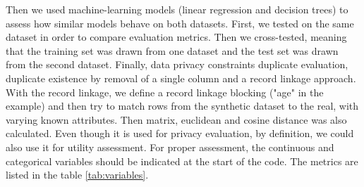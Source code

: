 Then we used machine-learning models (linear regression and decision trees) to assess how similar models behave on both datasets. First, we tested on the same dataset in order to compare evaluation metrics. Then we cross-tested, meaning that the training set was drawn from one dataset and the test set was drawn from the second dataset. Finally, data privacy constraints duplicate evaluation, duplicate existence by removal of a single column and a record linkage approach. With the record linkage, we define a record linkage blocking ("age" in the example) and then try to match rows from the synthetic dataset to the real, with varying known attributes. Then matrix, euclidean and cosine distance was also calculated. Even though it is used for privacy evaluation, by definition, we could also use it for utility assessment. For proper assessment, the continuous and categorical variables should be indicated at the start of the code. The metrics are listed in the table \ref{tab:variables}.








    


%
	




